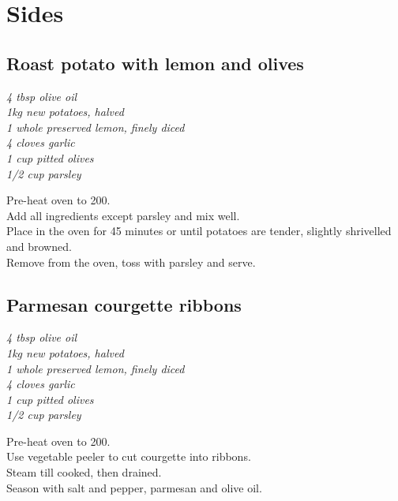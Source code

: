\documentclass{tufte-book}
\begin{document}
\chapter{Sides}
\section{Roast potato with lemon and olives}

\smallskip
\emph{4 tbsp olive oil
\\1kg new potatoes, halved
\\1 whole preserved lemon, finely diced
\\4 cloves garlic
\\1 cup pitted olives
\\1/2 cup parsley
}
\smallskip

Pre-heat oven to 200\celsius.
\\Add all ingredients except parsley and mix well.
\\Place in the oven for 45 minutes or until potatoes are tender, slightly shrivelled and browned. 
\\Remove from the oven, toss with parsley and serve.


\section{Parmesan courgette ribbons}

\emph{4 tbsp olive oil
\\1kg new potatoes, halved
\\1 whole preserved lemon, finely diced
\\4 cloves garlic
\\1 cup pitted olives
\\1/2 cup parsley
}

\smallskip
Pre-heat oven to 200\celsius.
\\Use vegetable peeler to cut courgette into ribbons.
\\Steam till cooked, then drained.
\\Season with salt and pepper, parmesan and olive oil.
\end{document}

